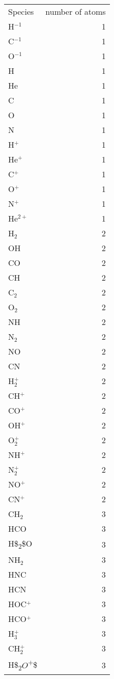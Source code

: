 \documentclass[11pt]{article}
\author{Gao-Yuan}
\date{\today}
\title{}
\begin{document}
\tableofcontents

\begin{center}
\begin{tabular}{lr}
Species & number of atoms\\
H\(^{-1}\) & 1\\
C\(^{-1}\) & 1\\
O\(^{-1}\) & 1\\
H & 1\\
He & 1\\
C & 1\\
O & 1\\
N & 1\\
H\(^{+}\) & 1\\
He\(^{+}\) & 1\\
C\(^{+}\) & 1\\
O\(^{+}\) & 1\\
N\(^{+}\) & 1\\
He\(^{2+}\) & 1\\
H\(_2\) & 2\\
OH & 2\\
CO & 2\\
CH & 2\\
C\(_2\) & 2\\
O\(_2\) & 2\\
NH & 2\\
N\(_2\) & 2\\
NO & 2\\
CN & 2\\
H\(_2^{+}\) & 2\\
CH\(^{+}\) & 2\\
CO\(^{+}\) & 2\\
OH\(^{+}\) & 2\\
O\(_2^{+}\) & 2\\
NH\(^{+}\) & 2\\
N\(_2^{+}\) & 2\\
NO\(^{+}\) & 2\\
CN\(^{+}\) & 2\\
CH\(_2\) & 3\\
HCO & 3\\
H\$\textsubscript{2}\$O & 3\\
NH\(_2\) & 3\\
HNC & 3\\
HCN & 3\\
HOC\(^{+}\) & 3\\
HCO\(^{+}\) & 3\\
H\(_3^{+}\) & 3\\
CH\(_2^{+}\) & 3\\
H\$\textsubscript{2}\(O\)\textsuperscript{+}\$ & 3\\

\end{tabular}
\end{center}
\end{document}
